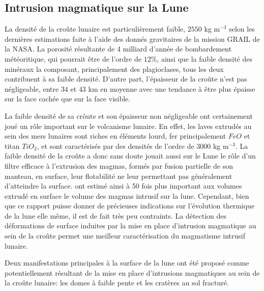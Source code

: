 \subsection{Intrusion magmatique sur la Lune}
\label{sec:moon}

La densité de la croûte lunaire est particulièrement faible, $2550$ kg
m$^{-3}$ selon  les dernières  estimations faite  à l'aide  des donnés
gravitaires de  la mission GRAIL de  la NASA\citep{Wieczorek:2013ipa}.
La  porosité   résultante  de  4  milliard   d'année  de  bombardement
météoritique, qui  pourrait être  de l'ordre de  $12\%$, ainsi  que la
faible  densité   des  minéraux   la  composant,   principalement  des
plagioclases, tous les  deux contribuent à sa  faible densité. D'autre
part, l'épaisseur  de la croûte  n'est pas négligeable, entre  $34$ et
$43$ km en moyenne  avec une tendance à être plus  épaisse sur la face
cachée que sur la face visible.

La faible  densité de sa crôute  et son épaisseur non  négligeable ont
certainement joué  un rôle  important sur  le volcanisme  lunaire.  En
effet, les  laves extrudés au  sein des  mers lunaires sont  riches en
éléments lourd,  fer principalement  $FeO$ et  titan $TiO_2$,  et sont
caractérisés par  des densités  de l'ordre de  $3000$ kg  m$^{-3}$. La
faible densité de la croûte a donc sans doute jouait aussi sur le Lune
le  rôle d'un  filtre efficace  à l'extrusion  des magmas,  formés par
fusion partielle de son manteau,  en surface, leur flotabilité ne leur
permettant        pas        généralement        d'atteindre        la
surface. \citet{Head:1992bk} ont estimé ainsi à 50 fois plus important
aux volumes  extrudé en surface le  volume des magmas intrusif  sur la
lune.   Cependant, bien  que ce  rapport puisse  donner de  précieuses
indications sur l'évolution thermique de la  lune elle même, il est de
fait très  peu contraints.  La  détection des déformations  de surface
induites par  la mise en  place d'intrusion  magmatique au sein  de la
croûte  permet une  meilleur  caractérisation  du magmatisme  intrusif
lunaire.

Deux  manifestations principales  à  la  surface de  la  lune ont  été
proposé  comme   potentiellement  résultant   de  la  mise   en  place
d'intrusions magmatiques  au sein  de la croûte  lunaire: les  domes à
faible pente et les cratères au sol fracturé.

